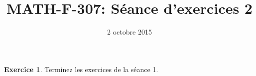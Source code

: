 \documentclass[11pt, a4paper]{article}
\begin{document}
 

\title{MATH-F-307: S\'eance d'exercices 2} 
\author{} 
\date{2 octobre 2015}

\theoremstyle{plain} 
\newtheorem*{theo}{Th\'eor\`eme}

\theoremstyle{definition} 
\newtheorem{exo}{Exercice}

\newcommand{\R}{\mathbb{R}} 
\newcommand{\Z}{\mathbb{Z}} 
\newcommand{\N}{\mathbb{N}} 

\renewcommand{\FrenchLabelItem}{\textbullet}

\maketitle


\begin{exo}
Terminez les exercices de la s\'eance 1.
\end{exo}
\end{document}
